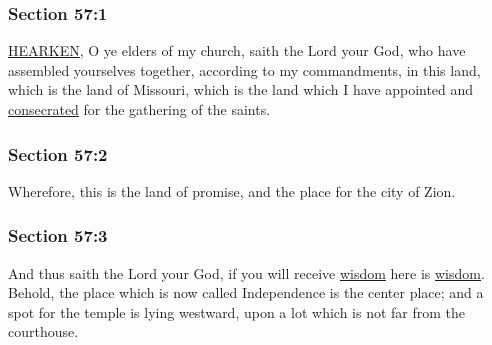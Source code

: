 	\subsubsection{Section 57:1} %
		\label{DC57-1}

		\hyperref[HEARKEN]{HEARKEN}, O ye elders of my church, saith the Lord your God, who have assembled yourselves together, according to my commandments, in this land, which is the land of Missouri, which is the land which I have appointed and \hyperref[CONSECRATION]{consecrated} for the gathering of the saints.


	\subsubsection{Section 57:2} %
		\label{DC57-2}

		Wherefore, this is the land of promise, and the place for the city of Zion.


	\subsubsection{Section 57:3} %
		\label{DC57-3}

		And thus saith the Lord your God, if you will receive \hyperref[WISDOM]{wisdom} here is \hyperref[WISDOM]{wisdom}.  Behold, the place which is now called Independence is the center place; and a spot for the temple is lying westward, upon a lot which is not far from the courthouse.


